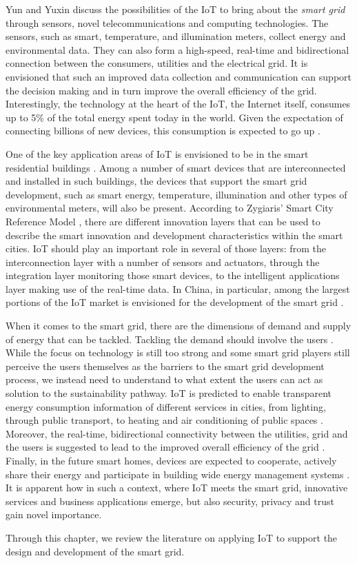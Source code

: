Yun and Yuxin \cite{yun2010research} discuss the possibilities of the IoT to bring about the \textit{smart grid} through sensors, novel telecommunications and computing technologies. The sensors, such as smart, temperature, and illumination meters, collect energy and environmental data. They can also form a high-speed, real-time and bidirectional connection between the consumers, utilities and the electrical grid. It is envisioned that such an improved data collection and communication can support the decision making and in turn improve the overall efficiency of the grid. Interestingly, the technology at the heart of the IoT, the Internet itself, consumes up to 5\% of the total energy spent today in the world. Given the expectation of connecting billions of new devices, this consumption is expected to go up \cite{gubbi2013internet}.	

One of the key application areas of IoT is envisioned to be in the smart residential buildings \cite{schatten2014smart}. Among a number of smart devices that are interconnected and installed in such buildings, the devices that support the smart grid development, such as smart energy, temperature, illumination and other types of environmental meters,  will also be present. According to Zygiaris' Smart City Reference Model \cite{zygiaris2013smart}, there are different innovation layers that can be used to describe the smart innovation and development characteristics within the smart cities. IoT should play an important role in several of those layers: from the interconnection layer with a number of sensors and actuators, through the integration layer monitoring those smart devices, to the intelligent applications layer making use of the real-time data. In China, in particular, among the largest portions of the IoT market is envisioned for the development of the smart grid \cite{shin2014socio}.

When it comes to the smart grid, there are the dimensions of demand and supply of energy that can be tackled. Tackling the demand should involve the users \cite{verbong2013smart}. While the focus on technology is still too strong and some smart grid players still perceive the users themselves as the barriers to the smart grid development process, we instead need to understand to what extent the users can act as solution to the sustainability pathway. IoT is predicted to enable transparent energy consumption information of different services in cities, from lighting, through public transport, to heating and air conditioning of public spaces \cite{zanella2014internet}. Moreover, the real-time, bidirectional connectivity between the utilities, grid and the users is suggested to lead to the improved overall efficiency of the grid \cite{yun2010research,li2011applications}. Finally, in the future smart homes, devices are expected to cooperate, actively share their energy and participate in building wide energy management systems \cite{karnouskos2010cooperative}. It is apparent how in such a context, where IoT meets the smart grid, innovative services and business applications emerge, but also security, privacy and trust gain novel importance.

\begin{svgraybox}
Through this chapter, we review the literature on applying IoT to support the design and development of the smart grid.
\end{svgraybox}
